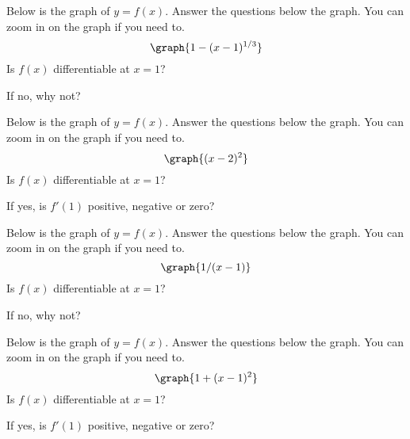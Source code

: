 \documentclass{ximera}
\begin{document}
\begin{problem}
Below is the graph of $y = f(x)$.  Answer the questions below the graph.  You can zoom in on the graph if you need to.
\[
\graph{1 - (x-1)^{1/3}}
\]
Is $f(x)$ differentiable at $x = 1$?
\begin{multipleChoice}
\end{multipleChoice}
If no, why not?
\begin{multipleChoice}
\end{multipleChoice}
\end{problem}



\begin{problem}
Below is the graph of $y = f(x)$.  Answer the questions below the graph.  You can zoom in on the graph if you need to.
\[
\graph{(x-2)^2}
\]
Is $f(x)$ differentiable at $x = 1$?
\begin{multipleChoice}
\end{multipleChoice}
If yes, is $f'(1)$ positive, negative or zero?
\begin{multipleChoice}
\end{multipleChoice}
\end{problem}


\begin{problem}
Below is the graph of $y = f(x)$.  Answer the questions below the graph.  You can zoom in on the graph if you need to.
\[
\graph{1/(x-1)}
\]
Is $f(x)$ differentiable at $x = 1$?
\begin{multipleChoice}
\end{multipleChoice}
If no, why not?
\begin{multipleChoice}
\end{multipleChoice}
\end{problem}



\begin{problem}
Below is the graph of $y = f(x)$.  Answer the questions below the graph.  You can zoom in on the graph if you need to.
\[
\graph{1 + (x-1)^2}
\]
Is $f(x)$ differentiable at $x = 1$?
\begin{multipleChoice}
\end{multipleChoice}
If yes, is $f'(1)$ positive, negative or zero?
\begin{multipleChoice}
\end{multipleChoice}
\end{problem}
\end{document}

